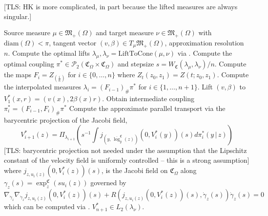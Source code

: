 \documentclass{article}
\newcommand{\tls}[1]{{\color{cyan}[TLS: #1]}}
\begin{document}
\tls{HK is more complicated, in part because the lifted measures are always singular.}
\begin{algorithm}[H]
    \begin{algorithmic}[1]
        \caption{Parallel transport on $(\mathfrak{M}_+(\Omega), \text{HK})$}
        \label{alg: HK parallel transport}
        \Require Source measure $\mu \in \mathfrak{M}_+(\Omega)$ and target measure $\nu \in \mathfrak{M}_+(\Omega)$ with $\text{diam}(\Omega) < \pi$, tangent vector $(v, \beta) \in T_{\mu}\mathfrak{M}_+(\Omega)$, approximation resolution $n$.  
        \State Compute the optimal lifts $\lambda_{\mu}, \lambda_{\nu} = \text{LiftToCone}(\mu, \nu)$ via .
        \State Compute the optimal coupling $\pi^* \in \mathcal{P}_2(\mathfrak{C}_{\Omega} \times \mathfrak{C}_{\Omega})$ and stepsize $s = W_\mathfrak{C}(\lambda_\mu, \lambda_\nu)/n.$
        \State Compute the maps $F_i = Z_{(\frac{i}{n})}$ for $i \in \{0, \dots, n\}$ where $Z_t(z_0, z_1) = Z(t; z_0, z_1)$.
        \State Compute the interpolated measures $\lambda_i = (F_{i-1})_\#\pi^*$ for $i \in \{1, \dots, n+1\}$.
        \State Lift $(v, \beta)$ to $V^*_1(x,r) = \left(v(x), 2\beta(x)r\right)$. 
            \State Obtain intermediate coupling $\pi^*_{i} = (F_{i-1}, F_i)_\#\pi^*$
            \State Compute the approximate parallel transport via the barycentric projection of the Jacobi field,
            \[V^*_{i + 1}(z) = \Pi_{\lambda_{i + 1}}\left(s^{-1}\int j_{\left(y, \, \overline{\log}^{\mathfrak{C}}_y(z)\right)}\left(0, V^*_i(y)\right)(s)d\pi_i^*(y \,|\, z)\right)\]
            \tls{barycentric projection not needed under the assumption that the Lipschitz constant of the velocity field is uniformly controlled -- this is a strong assumption}
            \hspace{\algorithmicindent} where $j_{z, u_i(z)}(0, V_i^*(z))(s)$, is the Jacobi field on $\mathfrak{C}_\Omega$ along $\gamma_z(s) = \exp^{\mathfrak{C}}_z(su_i(z))$ governed by 
            \[\nabla_{\dot \gamma_z}\nabla_{\dot \gamma_z} j_{z, u_i(z)}(0, V_i^*(z))(s) + R\left(j_{z, u_i(z)}(0, V_i^*(z))(s), \dot \gamma_z(s)\right)\dot \gamma_z(s) = 0\]
            \hspace{\algorithmicindent}which can be computed via .
        \EndFor
        \State \Return $V^*_{n+1} \in L_2(\lambda_\nu)$. 
    \end{algorithmic}
\end{algorithm}
\end{document}
